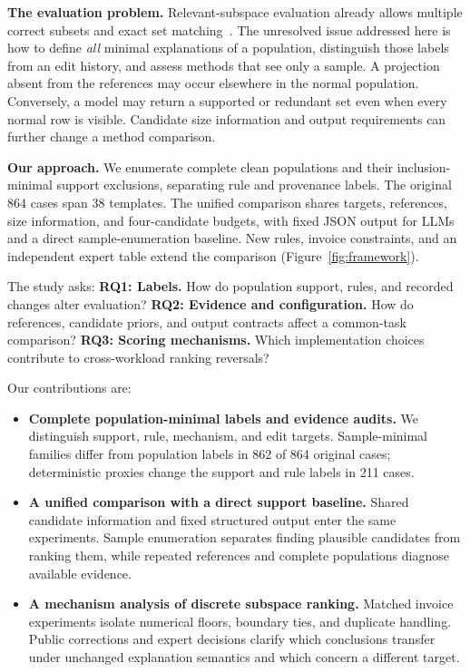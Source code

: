 \documentclass[conference]{IEEEtran}
\begin{document}
\textbf{The evaluation problem.} Relevant-subspace evaluation already allows multiple correct subsets and exact set matching~\cite{myrtakis2021comparative}. The unresolved issue addressed here is how to define \emph{all} minimal explanations of a population, distinguish those labels from an edit history, and assess methods that see only a sample. A projection absent from the references may occur elsewhere in the normal population. Conversely, a model may return a supported or redundant set even when every normal row is visible. Candidate size information and output requirements can further change a method comparison.

\textbf{Our approach.} We enumerate complete clean populations and their inclusion-minimal support exclusions, separating rule and provenance labels. The original 864 cases span 38 templates. The unified comparison shares targets, references, size information, and four-candidate budgets, with fixed JSON output for LLMs and a direct sample-enumeration baseline. New rules, invoice constraints, and an independent expert table extend the comparison (Figure~\ref{fig:framework}).

The study asks: \textbf{RQ1: Labels.} How do population support, rules, and recorded changes alter evaluation? \textbf{RQ2: Evidence and configuration.} How do references, candidate priors, and output contracts affect a common-task comparison? \textbf{RQ3: Scoring mechanisms.} Which implementation choices contribute to cross-workload ranking reversals?

Our contributions are:
\begin{itemize}
\item \textbf{Complete population-minimal labels and evidence audits.} We distinguish support, rule, mechanism, and edit targets. Sample-minimal families differ from population labels in 862 of 864 original cases; deterministic proxies change the support and rule labels in 211 cases.
\item \textbf{A unified comparison with a direct support baseline.} Shared candidate information and fixed structured output enter the same experiments. Sample enumeration separates finding plausible candidates from ranking them, while repeated references and complete populations diagnose available evidence.
\item \textbf{A mechanism analysis of discrete subspace ranking.} Matched invoice experiments isolate numerical floors, boundary ties, and duplicate handling. Public corrections and expert decisions clarify which conclusions transfer under unchanged explanation semantics and which concern a different target.
\end{itemize}
\end{document}

